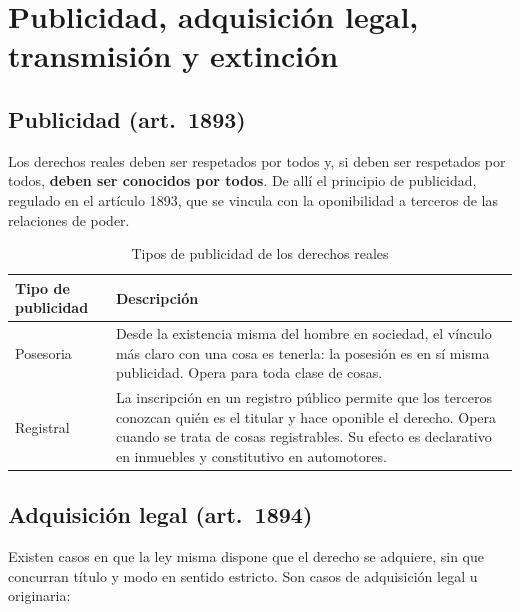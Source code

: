 \documentclass[12pt,oneside]{book}
\begin{document}
\chapter[Publicidad, adquisición legal, transmisión y extinción]{Publicidad, adquisición legal, transmisión y extinción}\label{cap:publicidad}

\section{Publicidad (art.~1893)}

Los derechos reales deben ser respetados por todos y, si deben ser respetados por todos, \textbf{deben ser conocidos por todos}. De allí el principio de publicidad, regulado en el artículo 1893, que se vincula con la oponibilidad a terceros de las relaciones de poder.

\begin{table}[H]
\centering
\small
\begin{tabularx}{\textwidth}{>{\raggedright\arraybackslash}p{}>{\raggedright\arraybackslash}X}
\toprule
\textbf{Tipo de publicidad} & \textbf{Descripción} \\
\midrule
Posesoria & Desde la existencia misma del hombre en sociedad, el vínculo más claro con una cosa es tenerla: la posesión es en sí misma publicidad. Opera para toda clase de cosas. \\
Registral & La inscripción en un registro público permite que los terceros conozcan quién es el titular y hace oponible el derecho. Opera cuando se trata de cosas registrables. Su efecto es declarativo en inmuebles y constitutivo en automotores. \\
\bottomrule
\end{tabularx}
\caption{Tipos de publicidad de los derechos reales}
\end{table}

\section{Adquisición legal (art.~1894)}

Existen casos en que la ley misma dispone que el derecho se adquiere, sin que concurran título y modo en sentido estricto. Son casos de adquisición legal u originaria:
\end{document}
